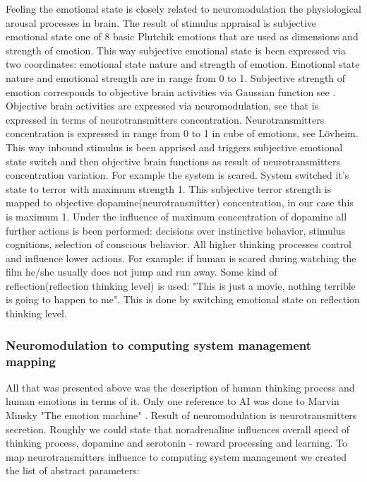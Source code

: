 Feeling the emotional state is closely related to neuromodulation the physiological arousal processes in brain. The result of stimulus appraisal is subjective emotional state one of 8 basic Plutchik emotions that are used as dimensions and strength of emotion. This way subjective emotional state is been expressed via two coordinates: emotional state nature and strength of emotion. Emotional state nature and emotional strength are in range from 0 to 1. Subjective strength of emotion corresponds to objective brain activities via Gaussian function see \cite{hourglass}. Objective brain activities are expressed via neuromodulation, see \cite{emotionsbraintorobot} that is expressed in terms of neurotransmitters concentration. Neurotransmitters  concentration is expressed in range from 0 to 1 in cube of emotions, see L\"{o}vheim\cite{cubeofemotions}. This way inbound stimulus is been apprised and triggers subjective emotional state switch and then objective brain functions as result of neurotransmitters concentration variation. For example the system is scared. System switched it's state to terror with maximum strength 1. This subjective terror strength is mapped to objective dopamine(neurotransmitter) concentration, in our case this is maximum 1. Under the influence of maximum concentration of dopamine all further actions is been performed: decisions over instinctive behavior, stimulus cognitions, selection of conscious behavior. All higher thinking processes control and influence lower actions. For example: if human is scared during watching the film he/she usually does not jump and run away. Some kind of reflection(reflection thinking level) is used: "This is just a movie, nothing terrible is going to happen to me". This is done by switching emotional state on reflection thinking level.

\subsubsection{Neuromodulation to computing system management mapping}

All that was presented above was the description of human thinking process and human emotions in terms of it. Only one reference to AI was done to Marvin Minsky "The emotion machine" \cite{emotionmachine}. Result of neuromodulation is neurotransmitters secretion. Roughly we could state that noradrenaline influences overall speed of thinking process, dopamine and serotonin - reward processing and learning. To map neurotransmitters influence to computing system management we created the list of abstract parameters: 
